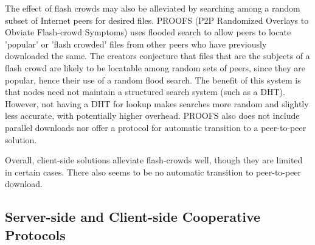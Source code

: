 {The effect of  flash crowds may also be alleviated by searching among a random subset of Internet peers for desired files.  PROOFS \cite{proofs} (P2P Randomized Overlays to Obviate Flash-crowd Symptoms) uses flooded search to allow peers to locate 'popular' or 'flash crowded' files from other peers who have previously downloaded the same.  The creators conjecture that files that are the subjects of a flash crowd are likely to be locatable among random sets of peers, since they are popular, hence their use of a random flood search.  The benefit of this system is that nodes need not maintain a structured search system (such as a DHT). However, not having a DHT for lookup makes searches more random and slightly less accurate, with potentially higher overhead.  PROOFS also does not include parallel downloads nor offer a protocol for automatic transition to a peer-to-peer solution.

Overall, client-side solutions alleviate flash-crowds well, though they are limited in certain cases. There also seems to be no automatic transition to peer-to-peer download.

\subsection{Server-side and Client-side Cooperative Protocols} 

}
